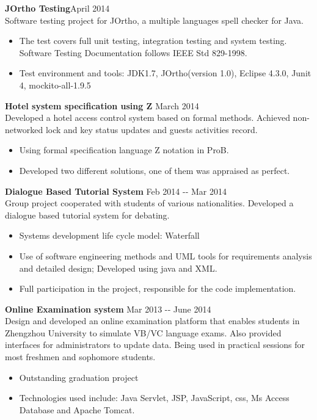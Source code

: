 \documentclass[margin]{res}
\begin{document}
\begin{resume}
{\bf JOrtho Testing}\hfill April 2014\\
Software testing project for JOrtho, a multiple languages spell checker for
Java.
\begin{itemize}
  \item The test covers full
unit testing, integration testing and system testing. Software Testing
Documentation follows IEEE Std 829-1998. 
\item Test environment and tools: JDK1.7, JOrtho(version 1.0), Eclipse 4.3.0,
Junit 4, mockito-all-1.9.5
\end{itemize}
{\bf Hotel system specification using Z} \hfill March 2014\\
Developed a hotel access control system based on formal methods.
Achieved non-networked lock and key status updates and guests
activities record.
\begin{itemize}
   \item Using formal specification language Z notation in ProB. 
   \item Developed two different solutions, one of them was appraised as
   perfect.
 \end{itemize}
{\bf Dialogue Based Tutorial System} \hfill Feb 2014 -­‐ Mar 2014\\
Group project cooperated with students of various nationalities. Developed a
dialogue based tutorial system for debating.
\begin{itemize}
  \item Systems development life cycle model: Waterfall
  \item Use of software engineering methods and UML tools for requirements
  analysis and detailed design; Developed using java and XML.
  \item Full participation in the project, responsible for the code implementation.
\end{itemize}
{\bf Online Examination system} \hfill Mar 2013 -­‐ June 2014\\
Design and developed an online examination platform that enables students in
Zhengzhou University to simulate VB/VC language exams. Also provided interfaces
for administrators to update data. Being used in practical sessions for most
freshmen and sophomore students.
\begin{itemize} 
  \item Outstanding graduation project
  \item Technologies used
include: Java Servlet, JSP, JavaScript, css, Ms Access Database and Apache
Tomcat.
\end{itemize}


\end{resume}
\end{document}
